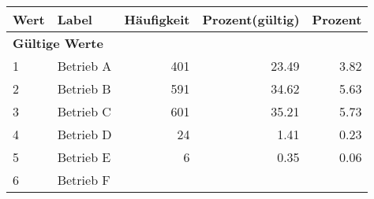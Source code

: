      \begin{longtable}{lXrrr}
     \toprule
     \textbf{Wert} & \textbf{Label} & \textbf{Häufigkeit} & \textbf{Prozent(gültig)} & \textbf{Prozent} \\
     \endhead
     \midrule
     \multicolumn{5}{l}{\textbf{Gültige Werte}}\\

     1 &
     \multicolumn{1}{X}{ Betrieb A   } &


       \num{401} &
       \num[round-mode=places,round-precision=2]{23.49} &
         \num[round-mode=places,round-precision=2]{3.82} \\

     2 &
     \multicolumn{1}{X}{ Betrieb B   } &


       \num{591} &
       \num[round-mode=places,round-precision=2]{34.62} &
         \num[round-mode=places,round-precision=2]{5.63} \\

     3 &
     \multicolumn{1}{X}{ Betrieb C   } &


       \num{601} &
       \num[round-mode=places,round-precision=2]{35.21} &
         \num[round-mode=places,round-precision=2]{5.73} \\

     4 &
     \multicolumn{1}{X}{ Betrieb D   } &


       \num{24} &
       \num[round-mode=places,round-precision=2]{1.41} &
         \num[round-mode=places,round-precision=2]{0.23} \\

     5 &
     \multicolumn{1}{X}{ Betrieb E   } &


       \num{6} &
       \num[round-mode=places,round-precision=2]{0.35} &
         \num[round-mode=places,round-precision=2]{0.06} \\

     6 &
     \multicolumn{1}{X}{ Betrieb F   } &



\end{longtable}
